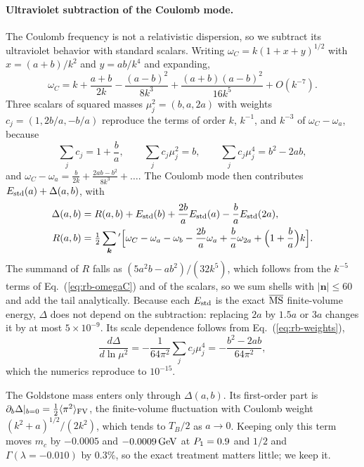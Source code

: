 \paragraph{Ultraviolet subtraction of the Coulomb mode.}
The Coulomb frequency is not a relativistic dispersion, so we subtract its ultraviolet behavior with standard scalars.
Writing $\omega_C=k(1+x+y)^{1/2}$ with $x=(a+b)/k^2$ and $y=ab/k^4$ and expanding,
\begin{equation}
\omega_C=k+\frac{a+b}{2k}-\frac{(a-b)^2}{8k^3}+\frac{(a+b)(a-b)^2}{16k^5}+O(k^{-7}).
\label{eq:rb-omegaC}
\end{equation}
Three scalars of squared masses $\mu_j^2=(b,a,2a)$ with weights $c_j=(1,2b/a,-b/a)$ reproduce the terms of order $k$, $k^{-1}$, and $k^{-3}$ of $\omega_C-\omega_a$, because
\begin{equation}
\sum_jc_j=1+\frac ba,\qquad \sum_jc_j\mu_j^2=b,\qquad \sum_jc_j\mu_j^4=b^2-2ab,
\label{eq:rb-weights}
\end{equation}
and $\omega_C-\omega_a=\frac{b}{2k}+\frac{2ab-b^2}{8k^3}+\dots$.
The Coulomb mode then contributes $E_{\rm std}(a)+\Delta(a,b)$, with
\begin{align}
\Delta(a,b)={}&R(a,b)+E_{\rm std}(b)+\frac{2b}{a}E_{\rm std}(a)-\frac{b}{a}E_{\rm std}(2a),\nonumber\\
R(a,b)={}&\tfrac12\sum_{\bm k}{}'\Bigl[\omega_C-\omega_a-\omega_b-\frac{2b}{a}\omega_a+\frac{b}{a}\omega_{2a}+\Bigl(1+\frac ba\Bigr)k\Bigr].
\label{eq:rb-Delta}
\end{align}
The summand of $R$ falls as $(5a^2b-ab^2)/(32k^5)$, which follows from the $k^{-5}$ terms of Eq.~(\ref{eq:rb-omegaC}) and of the scalars, so we sum shells with $|\bm n|\le60$ and add the tail analytically. %
Because each $E_{\rm std}$ is the exact $\overline{\mathrm{MS}}$ finite-volume energy, $\Delta$ does not depend on the subtraction: replacing $2a$ by $1.5a$ or $3a$ changes it by at most $5\times10^{-9}$. %
Its scale dependence follows from Eq.~(\ref{eq:rb-weights}),
\begin{equation}
\frac{d\Delta}{d\ln\mu^2}=-\frac{1}{64\pi^2}\sum_jc_j\mu_j^4=-\frac{b^2-2ab}{64\pi^2},
\label{eq:rb-Delta-mu}
\end{equation}
which the numerics reproduce to $10^{-15}$. %

The Goldstone mass enters only through $\Delta(a,b)$.
Its first-order part is $\partial_b\Delta|_{b=0}=\frac12\langle\pi^2\rangle_{\rm FV}$, the finite-volume fluctuation with Coulomb weight $(k^2+a)^{1/2}/(2k^2)$, which tends to $T_B/2$ as $a\to0$. %
Keeping only this term moves $m_c$ by $-0.0005$ and $-0.0009\,\mathrm{GeV}$ at $P_1=0.9$ and $1/2$ and $\Gamma(\lambda=-0.010)$ by $0.3\%$, so the exact treatment matters little; we keep it. %

